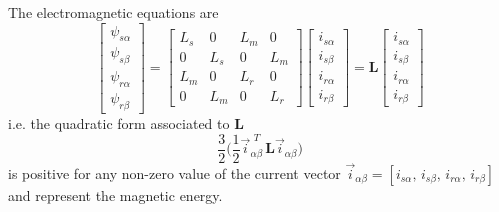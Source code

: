 \documentclass[12pt,a4paper,oneside]{book}
\begin{document}
\begin{onehalfspace}
The electromagnetic equations are
\begin{equation}\label{im_eq_21}
	\left[\begin{matrix}
		\psi_{s\alpha} \\[6pt]
		\psi_{s\beta} \\[6pt]
		\psi_{r\alpha} \\[6pt]
		\psi_{r\beta}
	\end{matrix}\right] = 
	\left[\begin{matrix}
		L_s & 0 & L_m & 0 \\[6pt]
		0 & L_s & 0 & L_m \\[6pt]
		L_m & 0 & L_r & 0 \\[6pt]
		0 & L_m & 0 & L_r 
	\end{matrix}\right]
	\left[\begin{matrix}
		i_{s\alpha} \\[6pt]
		i_{s\beta} \\[6pt]
		i_{r\alpha} \\[6pt]
		i_{r\beta} 
	\end{matrix}\right] = \mathbf{L}
	\left[\begin{matrix}
		i_{s\alpha} \\[6pt]
		i_{s\beta} \\[6pt]
		i_{r\alpha} \\[6pt]
		i_{r\beta} 
	\end{matrix}\right]
\end{equation}
i.e. the quadratic form associated to $\mathbf{L}$
\begin{equation}\label{im_eq_22}
	\frac{3}{2}\Bigg(\frac{1}{2}\vec{i}_{\alpha\beta}^{\,\,T} 
	\,\mathbf{L}\vec{i}_{\alpha\beta}\Bigg)
\end{equation}
is positive for any non-zero value of the current vector 
$\vec{i}_{\alpha\beta}=[i_{s\alpha},\,i_{s\beta},\,i_{r\alpha},\,i_{r\beta}]$ 
and represent the magnetic energy.


\end{onehalfspace}
\end{document}
